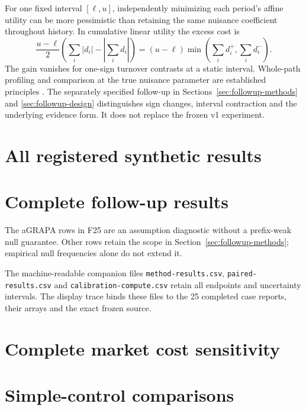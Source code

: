 For one fixed interval $[\ell,u]$, independently minimizing each period's
affine utility can be more pessimistic than retaining the same nuisance
coefficient throughout history. In cumulative linear utility the excess cost is
\[
 \frac{u-\ell}{2}
 \left(\sum_i|d_i|-\left|\sum_i d_i\right|\right)
 =(u-\ell)\min\left(\sum_i d_i^+,\sum_i d_i^-\right).
\]
The gain vanishes for one-sign turnover contrasts at a static interval.
Whole-path profiling and comparison at the true nuisance parameter are
established principles \citep{wasserman2020,ramdas2022}. The separately
specified follow-up in Sections~\ref{sec:followup-methods} and
\ref{sec:followup-design} distinguishes sign changes, interval contraction and
the underlying evidence form. It does not replace the frozen v1 experiment.

\clearpage
\section{All registered synthetic results}


\clearpage
\section{Complete follow-up results}

The aGRAPA rows in F25 are an assumption diagnostic without a prefix-weak
null guarantee. Other rows retain the scope in
Section~\ref{sec:followup-methods}; empirical null frequencies alone do not
extend it.

The machine-readable companion files \texttt{method-results.csv},
\texttt{paired-results.csv} and \texttt{calibration-compute.csv} retain all
endpoints and uncertainty intervals. The display trace binds these files to
the 25 completed case reports, their arrays and the exact frozen source.

\clearpage
\section{Complete market cost sensitivity}


\clearpage
\section{Simple-control comparisons}


